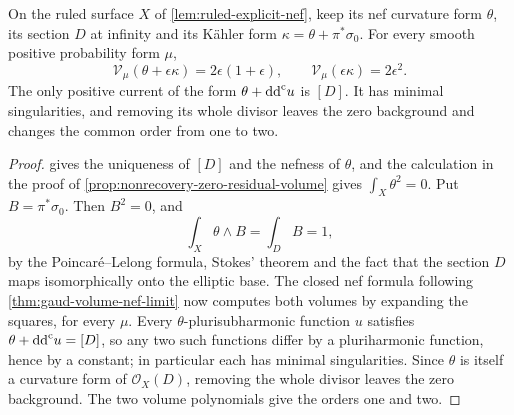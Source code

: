 \begin{corollary}\label{cor:nef-boundary-minimal-removal}
On the ruled surface $X$ of \cref{lem:ruled-explicit-nef}, keep its nef curvature form $\theta$, its section $D$ at infinity and its K\"ahler form $\kappa=\theta+\pi^*\sigma_0$. For every smooth positive probability form $\mu$,
\[
 \mathcal V_\mu(\theta+\epsilon\kappa)=2\epsilon(1+\epsilon),
 \qquad \mathcal V_\mu(\epsilon\kappa)=2\epsilon^2.
\]
The only positive current of the form $\theta+\mathrm{dd}^{\mathrm{c}} u$ is $[D]$. It has minimal singularities, and removing its whole divisor leaves the zero background and changes the common order from one to two.
\end{corollary}
\begin{proof}
 gives the uniqueness of $[D]$ and the nefness of $\theta$, and the calculation in the proof of \cref{prop:nonrecovery-zero-residual-volume} gives $\int_X\theta^2=0$. Put $B=\pi^*\sigma_0$. Then $B^2=0$, and
\[
 \int_X\theta\wedge B=\int_D B=1,
\]
by the Poincar\'e--Lelong formula, Stokes' theorem and the fact that the section $D$ maps isomorphically onto the elliptic base. The closed nef formula following \cref{thm:gaud-volume-nef-limit} now computes both volumes by expanding the squares, for every $\mu$. Every $\theta$-plurisubharmonic function $u$ satisfies $\theta+\mathrm{dd}^{\mathrm{c}} u=[D]$, so any two such functions differ by a pluriharmonic function, hence by a constant; in particular each has minimal singularities. Since $\theta$ is itself a curvature form of $\mathcal O_X(D)$, removing the whole divisor leaves the zero background. The two volume polynomials give the orders one and two.
\end{proof}
